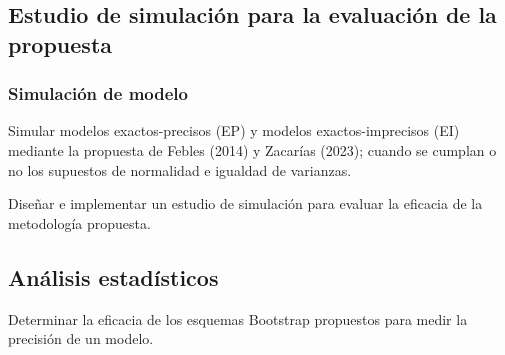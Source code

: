 	 	 
	 \subsection{Estudio de simulación para la evaluación de la propuesta}
	 \vspace{1.5cm}
	
	 \subsubsection{Simulación de modelo}
	 Simular modelos exactos-precisos (EP) y modelos exactos-imprecisos (EI) mediante la propuesta de Febles (2014) y Zacarías (2023); cuando se cumplan o no los supuestos de normalidad e igualdad de varianzas.
	 
	 Diseñar e implementar un estudio de simulación para evaluar la eficacia de la metodología propuesta.
	 	 \vspace{1.5cm}
	 	 
	 	 
	 	 
	 	 
	 \subsection{Análisis estadísticos}
	 Determinar la eficacia de los esquemas Bootstrap propuestos para medir la precisión de un modelo.




